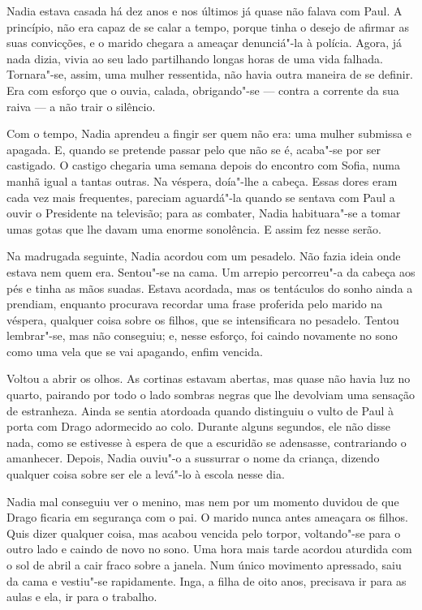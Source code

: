 Nadia estava casada há dez anos e nos últimos já quase não falava com
Paul. A princípio, não era capaz de se calar a tempo, porque tinha o
desejo de afirmar as suas convicções, e o marido chegara a ameaçar
denunciá"-la à polícia. Agora, já nada dizia, vivia ao seu lado partilhando longas horas %
de uma vida falhada. Tornara"-se, assim, uma mulher
ressentida, não havia outra maneira de se definir. Era com esforço que o
ouvia, calada, obrigando"-se --- contra a corrente da sua raiva --- a não
trair o silêncio.

Com o tempo, Nadia aprendeu a fingir ser quem não era: uma mulher
submissa e apagada. E, quando se pretende passar pelo que não se é,
acaba"-se por ser castigado. O castigo chegaria uma semana depois do
encontro com Sofia, numa manhã igual a tantas outras. Na véspera,
doía"-lhe a cabeça. Essas dores eram cada vez mais frequentes, pareciam
aguardá"-la quando se sentava com Paul a ouvir o Presidente na televisão;
para as combater, Nadia habituara"-se a tomar umas gotas que lhe davam
uma enorme sonolência. E assim fez nesse serão.

Na madrugada seguinte, Nadia acordou com um pesadelo. Não fazia ideia
onde estava nem quem era. Sentou"-se na cama. Um arrepio percorreu"-a da
cabeça aos pés e tinha as mãos suadas. Estava acordada, mas os
tentáculos do sonho ainda a prendiam, enquanto procurava recordar uma
frase proferida pelo marido na véspera, qualquer coisa sobre os filhos,
que se intensificara no pesadelo. Tentou lembrar"-se, mas não conseguiu;
e, nesse esforço, foi caindo novamente no sono como uma vela que se vai
apagando, enfim vencida.

Voltou a abrir os olhos. As cortinas estavam abertas, mas quase não
havia luz no quarto, pairando por todo o lado sombras negras que lhe
devolviam uma sensação de estranheza. Ainda se sentia atordoada quando
distinguiu o vulto de Paul à porta com Drago adormecido ao colo. Durante
alguns segundos, ele não disse nada, como se estivesse à espera de que a
escuridão se adensasse, contrariando o amanhecer. Depois, Nadia
ouviu"-o a sussurrar o nome da criança, dizendo qualquer coisa sobre ser
ele a levá"-lo à escola nesse dia.

Nadia mal conseguiu ver o menino, mas nem por um momento duvidou de que
Drago ficaria em segurança com o pai. O marido nunca antes ameaçara os
filhos. Quis dizer qualquer coisa, mas acabou vencida pelo torpor,
voltando"-se para o outro lado e caindo de novo no sono. Uma hora mais
tarde acordou aturdida com o sol de abril a cair fraco sobre a janela.
Num único movimento apressado, saiu da cama e vestiu"-se rapidamente.
Inga, a filha de oito anos, precisava ir para as aulas e ela, ir
para o trabalho.

